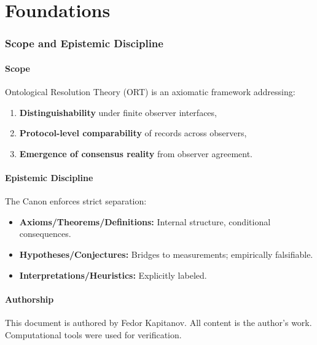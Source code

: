 \documentclass[12pt,a4paper]{article}
\numberwithin{equation}{section}
\theoremstyle{plain}
\theoremstyle{definition}
\theoremstyle{remark}
\begin{document}
\tableofcontents
\newpage

\part{Foundations}
\label{part:foundations}

\section{Scope and Epistemic Discipline}
\label{sec:scope}

\subsection{Scope}

Ontological Resolution Theory (ORT) is an axiomatic framework addressing:
\begin{enumerate}[label=(\roman*),nosep]
\item \textbf{Distinguishability} under finite observer interfaces,
\item \textbf{Protocol-level comparability} of records across observers,
\item \textbf{Emergence of consensus reality} from observer agreement.
\end{enumerate}

\subsection{Epistemic Discipline}

The Canon enforces strict separation:
\begin{itemize}[nosep]
\item \textbf{Axioms/Theorems/Definitions:} Internal structure, conditional consequences.
\item \textbf{Hypotheses/Conjectures:} Bridges to measurements; empirically falsifiable.
\item \textbf{Interpretations/Heuristics:} Explicitly labeled.
\end{itemize}

\subsection{Authorship}

This document is authored by Fedor Kapitanov. All content is the author's work. Computational tools were used for verification.
\end{document}
